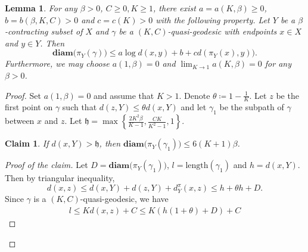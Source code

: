 \documentclass{amsart}
\numberwithin{thm}{section}
\numberwithin{figure}{section}
\newtheorem{lem}[thm]{Lemma}
\newtheorem{claim}[thm]{Claim}
\theoremstyle{definition}
\theoremstyle{definition}
\theoremstyle{remark}
\newcommand{\diam }[1]{{\textbf{diam}\big(#1\big)}}
\numberwithin{equation}{section}
\theoremstyle{plain}
\begin{document}
\begin{lem}\label{projLip}
	For any $\beta>0$, $C\ge 0, K\ge 1$, there exist $a = a(K, \beta) \ge 0$, $b = b(\beta, K, C) > 0$ and $c = c(K) > 0$ with the following property. 
	Let $Y$ be a $\beta$-contracting subset of $X$ and $\gamma$ be a $(K, C)$-quasi-geodesic with endpoints $x\in X$ and $y\in Y$. Then $$\diam {\pi_{Y}(\gamma)} \le a \log d(x, y) + b + c d(\pi_Y(x), y)).$$ Furthermore,  we may choose $a(1, \beta)=0$ and $\lim_{K\to 1} a(K, \beta) = 0$ for any $\beta > 0$. 
\end{lem}
\begin{proof}
	Set $a(1, \beta)=0$ and assume that $K>1$. Denote $\theta \coloneqq 1-\frac{1}{K}$.
	Let $z$ be the first point on $\gamma$ such that $d(z, Y) \le  \theta d(x, Y)$ and let $\gamma_1$ be the subpath of $\gamma$ between $x$ and $z$. Let $\mathfrak h = \max\left\{\frac{2K^2\beta}{K-1}, \frac{CK}{K^2-1}, 1\right\}$.
	\begin{claim}
		If $d(x, Y) > \mathfrak h$, then $\diam{\pi_Y(\gamma_1)} \le 6(K + 1) \beta$.
	\end{claim}
	\begin{proof}[Proof of the claim]
		Let $D = \diam{\pi_Y(\gamma_1)}$, $l = \mathrm{length}(\gamma_1)$ and $h = d(x, Y)$. Then by triangular inequality, $$d(x, z) \le d(x, Y) + d(z, Y) + d^{\pi}_Y(x, z) \le h + \theta h + D.$$ 
		Since $\gamma$ is a $(K, C)$-quasi-geodesic, we have \begin{align}\label{lboundEq}
			l \le K d(x, z) + C \le K(h(1+\theta) + D) + C
		\end{align}
		

\end{proof}
\end{proof}
\end{document}
